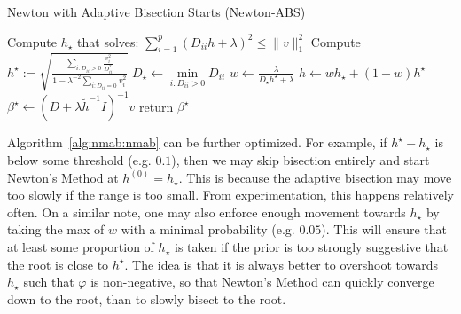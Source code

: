 \documentclass[fontsize=11pt]{article}
\newcommand{\norm}[1]{\|#1\|}
\newcommand{\abs}[1]{\left|#1\right|}
\begin{document}
\begin{algorithm}
    \caption{Newton with Adaptive Bisection Starts (Newton-ABS)}\label{alg:nmab:nmab}
    Compute $h_\star$ that solves:
    $
        \sum\limits_{i=1}^p
        (D_{ii} h + \lambda)^2
        \leq
        \norm{v}_1^2
    $\;
    Compute 
    $
        h^\star
        := 
        \sqrt{
            \frac{
                \sum\limits_{i: D_{ii} > 0} \frac{v_i^2}{D_{ii}^2}
            }{
                1 - \lambda^{-2} \sum\limits_{i : D_{ii} = 0} v_i^2            
            }
        }
    $\;
    $D_\star \gets \min\limits_{i : D_{ii} > 0} D_{ii}$\;
    $w \gets \frac{\lambda}{D_\star h^\star + \lambda}$\;
    $h \gets wh_\star + (1-w)h^\star$\;
    \While{$\varphi(h) < 0$ and $\abs{\varphi(h)} > \epsilon$}{
        $h^\star \gets h$\; 
        $w \gets \frac{\lambda}{D_\star h^\star + \lambda}$\;
        $h \gets wh_\star + (1-w)h^\star$\;
    }
    $\beta^\star \gets (D + \lambda \tilde{h}^{-1} I)^{-1} v$\;
    return $\beta^\star$\;
\end{algorithm}

Algorithm~\ref{alg:nmab:nmab} can be further optimized.
For example, if $h^\star - h_\star$ is below some threshold (e.g. $0.1$),
then we may skip bisection entirely and start Newton's Method at $h^{(0)} = h_\star$.
This is because the adaptive bisection may move too slowly if the range is too small.
From experimentation, this happens relatively often.
On a similar note, one may also enforce enough movement towards $h_\star$
by taking the max of $w$ with a minimal probability (e.g. $0.05$).
This will ensure that at least some proportion of $h_\star$ is taken 
if the prior is too strongly suggestive that the root is close to $h^\star$.
The idea is that it is always better to overshoot towards $h_\star$ such that $\varphi$ is non-negative,
so that Newton's Method can quickly converge down to the root,
than to slowly bisect to the root.


\end{document}
